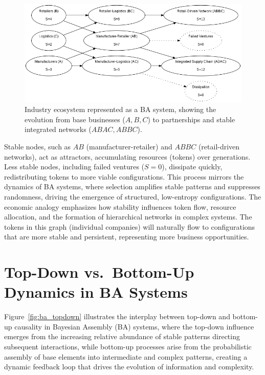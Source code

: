 \documentclass[entropy,article,submit,pdftex,moreauthors]{Definitions/mdpi}
\begin{document}
\begin{figure}[h]
    \centering
    \includegraphics[width=1\textwidth]{abc_eco.png}
    \caption{Industry ecosystem represented as a BA system, showing the evolution from base businesses (\( A, B, C \)) to partnerships and stable integrated networks (\( ABAC, ABBC \)).}
    \label{fig:ba_economic}
\end{figure}

Stable nodes, such as \( AB \) (manufacturer-retailer) and \( ABBC \) (retail-driven networks), act as attractors, accumulating resources (tokens) over generations. Less stable nodes, including failed ventures (\( S=0 \)), dissipate quickly, redistributing tokens to more viable configurations. This process mirrors the dynamics of BA systems, where selection amplifies stable patterns and suppresses randomness, driving the emergence of structured, low-entropy configurations. The economic analogy emphasizes how stability influences token flow, resource allocation, and the formation of hierarchical networks in complex systems. The tokens in this graph (individual companies) will naturally flow to configurations that are more stable and persistent, representing more business opportunities.

\section{Top-Down vs.\ Bottom-Up Dynamics in BA Systems}
\label{sec:topdown-bottomup}

Figure~\ref{fig:ba_topdown} illustrates the interplay between top-down and bottom-up causality in Bayesian Assembly (BA) systems, where the top-down influence emerges from the increasing relative abundance of stable patterns directing subsequent interactions, while bottom-up processes arise from the probabilistic assembly of base elements into intermediate and complex patterns, creating a dynamic feedback loop that drives the evolution of information and complexity.
\end{document}
